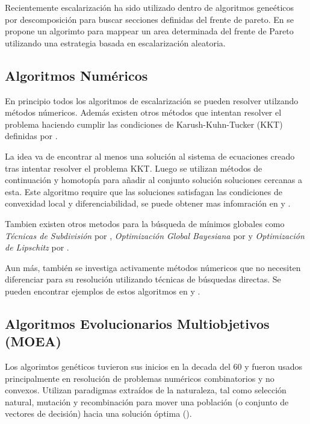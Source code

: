 Recientemente escalarizaci\'on ha sido utilizado dentro de algoritmos gene\'eticos por descomposici\'on para buscar secciones definidas del frente de pareto.  En \cite{paria2020flexible} se propone un algorimto para mappear un area determinada del frente de Pareto utilizando una estrategia basada en escalarizaci\'on aleatoria.


\subsection{Algoritmos Num\'ericos}

En principio todos los algoritmos de escalarizaci\'on se pueden resolver utilzando m\'etodos n\'umericos. Adem\'as existen otros m\'etodos  que intentan resolver el problema haciendo cumplir las condiciones de Karush-Kuhn-Tucker (KKT) definidas por \cite{kuhn2014nonlinear}.

La idea va de encontrar al menos una soluci\'on al sistema de ecuaciones creado tras intentar resolver el problema KKT. Luego se utilizan m\'etodos de continuaci\'on y homotop\'ia para añadir al conjunto soluci\'on soluciones cercanas a esta. Este algoritmo require que las soluciones satisfagan las condiciones de convexidad local y diferenciabilidad, se puede obtener mas infomraci\'on en \cite{hillermeier2001nonlinear} y \cite{schutze_et_al:DagSemProc.04461.16}.

Tambien existen otros metodos para la b\'usqueda de m\'inimos globales como \textit{T\'ecnicas de Subdivisi\'on} por \cite{dellnitz2005covering}, \textit{Optimizaci\'on Global Bayesiana} por \cite{emmerich2016multicriteria} y \textit{Optimizaci\'on de Lipschitz} por \cite{vzilinskas2013worst}. %

Aun m\'as, tambi\'en se investiga activamente m\'etodos n\'umericos que no necesiten diferenciar para su resoluci\'on utilizando t\'ecnicas de b\'usquedas directas. Se pueden encontrar ejemplos de estos algoritmos en \cite{custodio2011direct} y \cite{audet2010mesh}.

\subsection{Algoritmos Evolucionarios Multiobjetivos (MOEA)}

Los algorimtos gen\'eticos tuvieron sus inicios en la decada del 60 y fueron usados principalmente en resoluci\'on de problemas num\'ericos combinatorios y no convexos. Utilizan paradigmas extra\'idos de la naturaleza, tal como selecci\'on natural, mutaci\'on y recombinaci\'on para mover una poblaci\'on (o conjunto de vectores de decisi\'on) hacia una soluci\'on \'optima (\cite{back1996evolutionary}).

